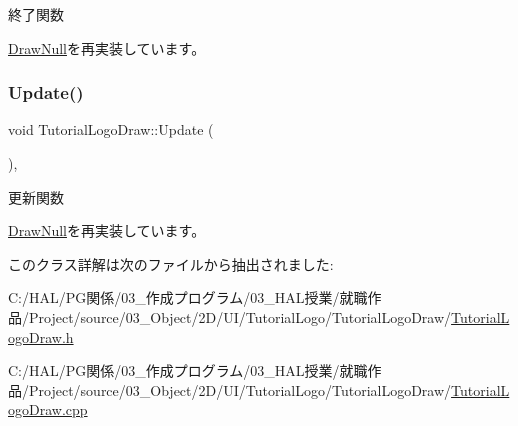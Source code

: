 終了関数 



\mbox{\hyperlink{class_draw_null_a12d44e341c7364b5ab9cdd661dc16187}{Draw\+Null}}を再実装しています。

\mbox{\label{class_tutorial_logo_draw_af69405fcc8b20684a19e982726d93ffa}} 
\subsubsection{\texorpdfstring{Update()}{Update()}}
{\footnotesize\ttfamily void Tutorial\+Logo\+Draw\+::\+Update (\begin{DoxyParamCaption}{ }\end{DoxyParamCaption})\hspace{0.3cm}{\ttfamily [override]}, {\ttfamily [virtual]}}



更新関数 



\mbox{\hyperlink{class_draw_null_a0149bcf84a34b138642ab7975ae46f30}{Draw\+Null}}を再実装しています。



このクラス詳解は次のファイルから抽出されました\+:\begin{DoxyCompactItemize}
\item 
C\+:/\+H\+A\+L/\+P\+G関係/03\+\_\+作成プログラム/03\+\_\+\+H\+A\+L授業/就職作品/\+Project/source/03\+\_\+\+Object/2\+D/\+U\+I/\+Tutorial\+Logo/\+Tutorial\+Logo\+Draw/\mbox{\hyperlink{_tutorial_logo_draw_8h}{Tutorial\+Logo\+Draw.\+h}}\item 
C\+:/\+H\+A\+L/\+P\+G関係/03\+\_\+作成プログラム/03\+\_\+\+H\+A\+L授業/就職作品/\+Project/source/03\+\_\+\+Object/2\+D/\+U\+I/\+Tutorial\+Logo/\+Tutorial\+Logo\+Draw/\mbox{\hyperlink{_tutorial_logo_draw_8cpp}{Tutorial\+Logo\+Draw.\+cpp}}\end{DoxyCompactItemize}
